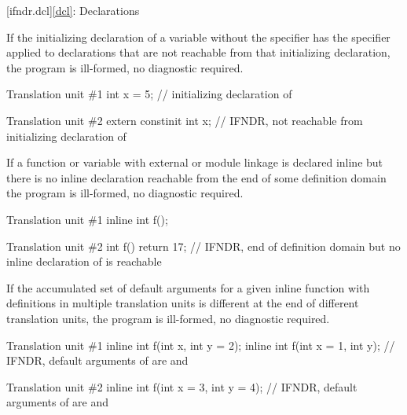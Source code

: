 [ifndr.dcl]{\ref*{dcl}: Declarations}


\pnum
If the initializing declaration
of a variable without the  specifier
has the  specifier
applied to declarations that are not reachable from
that initializing declaration,
the program is ill-formed, no diagnostic required.

\pnum
\begin{example}
\begin{codeblocktu}{Translation unit \#1}
int x = 5;  // initializing declaration of 
\end{codeblocktu}
\begin{codeblocktu}{Translation unit \#2}
extern constinit int x;     // IFNDR, not reachable from initializing declaration of 
\end{codeblocktu}
\end{example}


\pnum
If a function or variable
with external or module linkage
is declared inline
but there is no inline declaration
reachable from the end of some definition domain
the program is ill-formed, no diagnostic required.

\pnum
\begin{example}
\begin{codeblocktu}{Translation unit \#1}
inline int f();
\end{codeblocktu}
\begin{codeblocktu}{Translation unit \#2}
int f() { return 17; }
    // IFNDR, end of definition domain but no inline declaration of  is reachable
\end{codeblocktu}
\end{example}


\pnum
If the accumulated set of default arguments
for a given inline function
with definitions in multiple translation units
is different at the end
of different translation units,
the program is ill-formed, no diagnostic required.

\pnum
\begin{example}
\begin{codeblocktu}{Translation unit \#1}
inline int f(int x,     int y = 2);
inline int f(int x = 1, int y);
  // IFNDR, default arguments of  are  and 
\end{codeblocktu}
\begin{codeblocktu}{Translation unit \#2}
inline int f(int x = 3, int y = 4);
  // IFNDR, default arguments of  are  and 
\end{codeblocktu}
\end{example}


